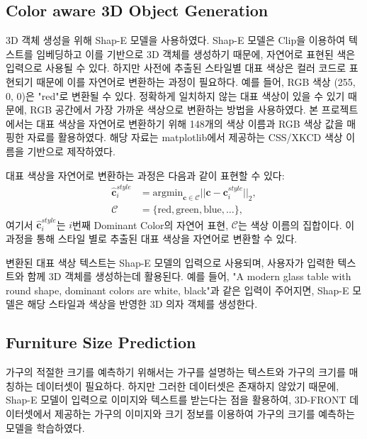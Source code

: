 \documentclass[11pt]{article}
\begin{document}
\subsection{Color aware 3D Object Generation}
3D 객체 생성을 위해 Shap-E\cite{jun2023shapegeneratingconditional3d} 모델을 사용하였다.
Shap-E 모델은 Clip\cite{pmlr-v139-radford21a}을 이용하여 텍스트를 임베딩하고 이를 기반으로 3D 객체를 생성하기 때문에, 자연어로 표현된 색은 입력으로 사용될 수 있다.
하지만 사전에 추출된 스타일별 대표 색상은 컬러 코드로 표현되기 때문에 이를 자연어로 변환하는 과정이 필요하다. 예를 들어, RGB 색상 (255, 0, 0)은 "red"로 변환될 수 있다.
정확하게 일치하지 않는 대표 색상이 있을 수 있기 때문에, RGB 공간에서 가장 가까운 색상으로 변환하는 방법을 사용하였다.
본 프로젝트에서는 대표 색상을 자연어로 변환하기 위해 148개의 색상 이름과 RGB 색상 값을 매핑한 자료를 활용하였다.
해당 자료는 matplotlib에서 제공하는 CSS/XKCD 색상 이름을 기반으로 제작하였다.

대표 색상을 자연어로 변환하는 과정은 다음과 같이 표현할 수 있다:
\begin{equation}
    \label{eq:color_to_text}
    \begin{aligned}
        \mathbf{\hat{c}}^{style}_i &= \text{argmin}_{\mathbf{c} \in \mathcal{C}} ||\mathbf{c} - \mathbf{c}^{style}_i||_2 , \\
        \mathcal{C} &= \{ \text{red}, \text{green}, \text{blue}, \ldots \} , 
    \end{aligned}
\end{equation}
여기서 $\mathbf{\hat{c}}^{style}_i$는 $i$번째 Dominant Color의 자연어 표현, $\mathcal{C}$는 색상 이름의 집합이다. 이 과정을 통해 스타일 별로 추출된 대표 색상을 자연어로 변환할 수 있다.

변환된 대표 색상 텍스트는 Shap-E 모델의 입력으로 사용되며, 사용자가 입력한 텍스트와 함께 3D 객체를 생성하는데 활용된다. 예를 들어, "A modern glass table with round shape, dominant colors are white, black"과 같은 입력이 주어지면, Shap-E 모델은 해당 스타일과 색상을 반영한 3D 의자 객체를 생성한다.

\subsection{Furniture Size Prediction}
가구의 적절한 크기를 예측하기 위해서는 가구를 설명하는 텍스트와 가구의 크기를 매칭하는 데이터셋이 필요하다. 
하지만 그러한 데이터셋은 존재하지 않았기 때문에, Shap-E 모델이 입력으로 이미지와 텍스트를 받는다는 점을 활용하여, 3D-FRONT 데이터셋에서 제공하는 가구의 이미지와 크기 정보를 이용하여 가구의 크기를 예측하는 모델을 학습하였다.
\end{document}
